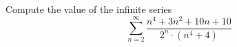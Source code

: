 Compute the value of the infinite series \[\sum_{n=2}^\infty \dfrac{n^4+3n^2+10n+10}{2^n\cdot(n^4+4)}\]